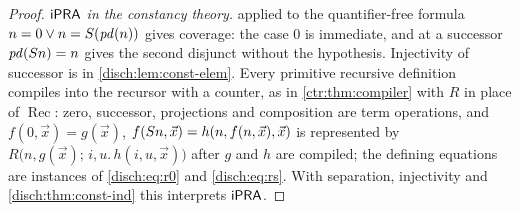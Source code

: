 \begin{proof}
\emph{$\mathsf{iPRA}$ in the constancy theory.}  applied
to the quantifier-free formula $n=0\lor n=S(\mathit{pd}(n))$ gives
coverage: the case $0$ is immediate, and at a successor
$\mathit{pd}(S n)=n$ gives the second disjunct without the hypothesis.
Injectivity of successor is in \cref{disch:lem:const-elem}. Every
primitive recursive definition compiles into the recursor with a counter,
as in \cref{ctr:thm:compiler} with $R$ in place of $\operatorname{Rec}$:
zero, successor, projections and composition are term operations, and
$f(0,\vec x)=g(\vec x)$,
$f(S n,\vec x)=h(n,f(n,\vec x),\vec x)$ is represented by
$R\bigl(n,g(\vec x);\,i,u.\,h(i,u,\vec x)\bigr)$ after $g$ and $h$ are
compiled; the defining equations are instances of \eqref{disch:eq:r0} and
\eqref{disch:eq:rs}. With separation, injectivity and
\cref{disch:thm:const-ind} this interprets $\mathsf{iPRA}$.


\end{proof}

